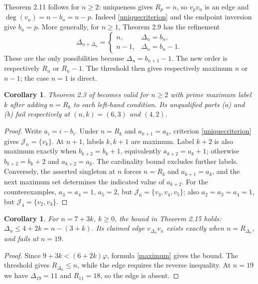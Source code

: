 \documentclass[11pt]{article}
\newtheorem{corollary}[theorem]{Corollary}
\newcommand{\J}{\mathcal J}
\newcommand{\ph}{\varphi}
\begin{document}
Theorem 2.11 follows for $n\ge2$: uniqueness gives $R_p=n$,
so $v_pv_n$ is an edge and
$\deg(v_n)=n-b_n=n-p$. Indeed \eqref{uniquecriterion} and
the endpoint inversion give $b_n=p$.
More generally, for $n\ge1$, Theorem 2.9 has the refinement
\begin{equation}\label{nested}
 \Delta_{n+\Delta_n}=
 \begin{cases}n,&\Delta_n=b_n,\\ n-1,&\Delta_n=b_n-1.\end{cases}
\end{equation}
These are the only possibilities because
$\Delta_n=b_{n+1}-1$. The new order is respectively $R_n$ or
$R_n-1$. The threshold then gives respectively maximum $n$ or $n-1$;
the case $n=1$ is direct.

\begin{corollary}\label{morrie}
Theorem 2.3 of \cite{original} becomes valid for $n\ge2$ with prime
maximum label $k$ after adding $n=R_k$ to each left-hand condition.
Its unqualified parts (a) and (b) fail respectively at $(n,k)=(6,3)$
and $(4,2)$.
\end{corollary}
\begin{proof}
Write $a_i=i-b_i$. Under $n=R_k$ and $a_{k+1}=a_k$,
criterion \eqref{uniquecriterion} gives $\J_n=\{v_k\}$.
At $n+1$, labels $k,k+1$ are maximum. Label $k+2$ is also maximum
exactly when $b_{k+2}=b_k+1$, equivalently $a_{k+2}=a_k+1$;
otherwise $b_{k+2}=b_k+2$ and $a_{k+2}=a_k$. The cardinality
bound excludes further labels. Conversely, the asserted singleton
at $n$ forces $n=R_k$ and $a_{k+1}=a_k$, and the next maximum
set determines the indicated value of $a_{k+2}$.
For the counterexamples, $a_3=a_4=1$, $a_5=2$, but
$\J_6=\{v_3,v_4,v_5\}$; also $a_2=a_3=a_4=1$, but
$\J_4=\{v_2,v_3\}$.
\end{proof}

\begin{corollary}\label{edgecorrection}
For $n=7+3k$, $k\ge0$, the bound in Theorem 2.15 holds:
$\Delta_n\le4+2k=n-(3+k)$. Its claimed edge $v_{\Delta_n}v_n$
exists exactly when $n=R_{\Delta_n}$, and fails at $n=19$.
\end{corollary}
\begin{proof}
Since $9+3k<(6+2k)\ph$, formula \eqref{maximum} gives the bound.
The threshold gives $R_{\Delta_n}\le n$, while the edge requires
the reverse inequality. At $n=19$ we have $\Delta_{19}=11$ and
$R_{11}=18$, so the edge is absent.
\end{proof}
\end{document}
